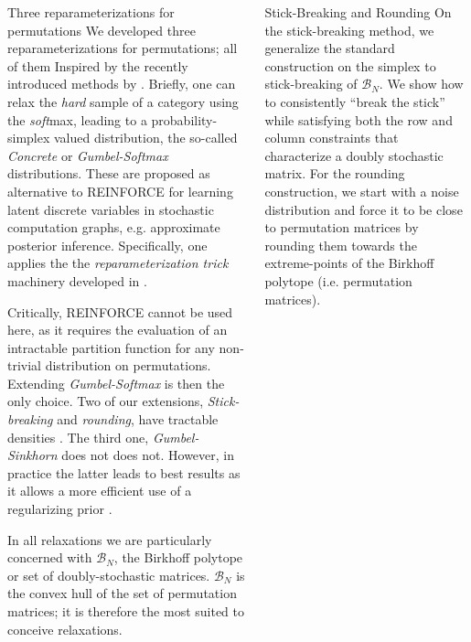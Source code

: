 \documentclass[final]{beamer}
\begin{document}
\begin{frame}[allowframebreaks]
\begin{minipage}[htp][1\textheight][t]{\textwidth}
\begin{columns}[t]
\begin{column}{.5\linewidth}
	  \begin{block}{Three reparameterizations for permutations}
We developed three reparameterizations for permutations; all of them Inspired by the recently introduced methods by \cite{Jang2016,Maddison2016}. Briefly, one can relax the \emph{hard} sample of a category using the \emph{soft}max, leading to a probability-simplex valued distribution, the so-called \emph{Concrete} or \emph{Gumbel-Softmax} distributions. These are proposed as alternative to REINFORCE \cite{Williams1992} for learning latent discrete variables in stochastic computation graphs, e.g. approximate posterior inference. Specifically, one applies the the \emph{reparameterization trick} machinery developed in \cite{Kingma2014}.

\vspace{0.5cm}
Critically, REINFORCE cannot be used here, as it requires the evaluation of an intractable partition function for any non-trivial distribution on permutations. Extending \emph{Gumbel-Softmax} is then the only choice. Two of our extensions, \emph{Stick-breaking} and \emph{rounding}, have tractable densities \cite{Linderman2017}. The third one, \emph{Gumbel-Sinkhorn} does not does not. However, in practice the latter leads to best results as it allows a more efficient use of a regularizing prior \cite{Mena2017}. 

In all relaxations we are particularly concerned with $\mathcal{B}_N$, the Birkhoff polytope or set of doubly-stochastic matrices. $\mathcal{B}_N$ is the convex hull of the set of permutation matrices; it is therefore the most suited to conceive relaxations.
	  \end{block}
            \end{column}    


            
            \begin{column}{.5\linewidth}
           
	              
	  
	    \begin{block}{Stick-Breaking and Rounding}
	    On the stick-breaking
method, we generalize the standard construction on the simplex \cite{linderman2015dependent} to
stick-breaking of $\mathcal{B}_N$. We show how to consistently
``break the stick'' while satisfying both the row and column
constraints that characterize a doubly stochastic matrix. For the
rounding construction, we start with a noise distribution and force it
to be close to permutation matrices by rounding them towards the
extreme-points of the Birkhoff polytope (i.e. permutation
matrices). 


\end{block}
\end{column}
\end{columns}
\end{minipage}
\end{frame}
\end{document}
